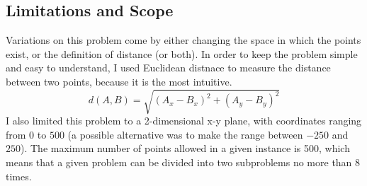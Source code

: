 \subsection{Limitations and Scope}
\hspace{-0.26in}
Variations on this problem come by either changing the space in which 
the points exist, or the definition of distance (or both). 
In order to keep the problem simple and easy to understand, 
I used Euclidean distnace to measure the distance between two points, 
because it is the most intuitive. 
\begin{displaymath}
d(A, B) = \sqrt{(A_x - B_x)^2 + (A_y - B_y)^2}
\end{displaymath}
I also limited this problem to a 2-dimensional x-y plane, with coordinates 
ranging from $0$ to $500$ 
(a possible alternative was to make the range between $-250$ and $250$).
The maximum number of points allowed in a given instance is 500,
which means that a given problem can be divided into two subproblems 
no more than 8 times.